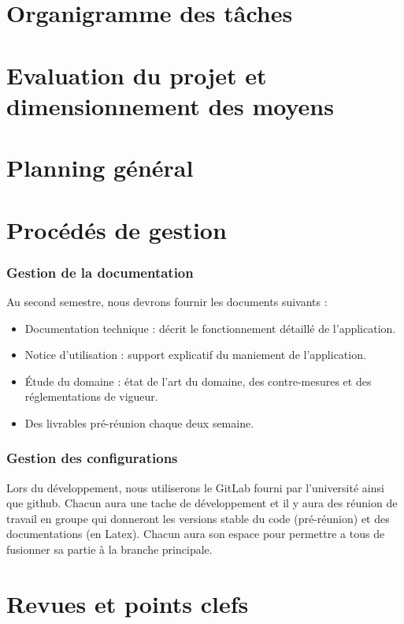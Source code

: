 \chapter{Organigramme des tâches}

\chapter{Evaluation du projet et dimensionnement des moyens}

\chapter{Planning général}

\chapter{Procédés de gestion}
\subsection{Gestion de la documentation}
		Au second semestre, nous devrons fournir les documents suivants :
		\begin{itemize}
			\item Documentation technique : décrit le fonctionnement détaillé de l’application.
			\item Notice d’utilisation : support explicatif du maniement de l’application.
			\item Étude du domaine : état de l’art du domaine, des contre-mesures et des
			réglementations de vigueur.
			\item Des livrables pré-réunion chaque deux semaine.\\ \newline
		\end{itemize}
	
		\subsection{Gestion des configurations}
		Lors du développement, nous utiliserons le GitLab fourni par l’université ainsi que github. Chacun
		aura une tache de développement et il y aura des réunion de travail en groupe qui donneront les versions
		stable du code (pré-réunion) et des documentations (en Latex). Chacun aura son espace pour
		permettre a tous de fusionner sa partie à la branche principale.



\chapter{Revues et points clefs}

